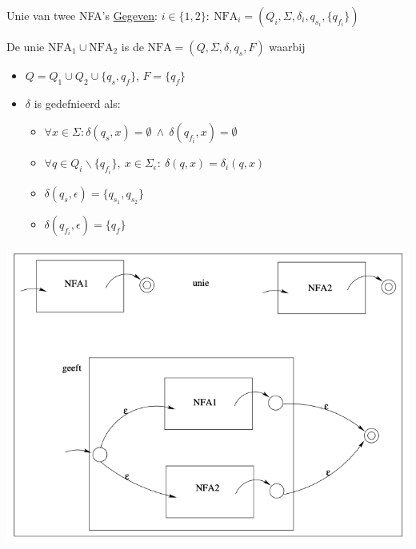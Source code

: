 \begin{pro}{Unie van twee NFA's}
    \underline{Gegeven}: $i \in \{1,2\}: \ \text{NFA}_i = (Q_i,\Sigma, \delta_i, q_{s_i}, \{q_{f_i}\})$ \\
    

    \begin{minipage}{.6\textwidth}
        De unie $\text{NFA}_1 \cup \text{NFA}_2$ is de $\text{NFA} = (Q,\Sigma, \delta, q_s, F)$ waarbij 
        \begin{itemize}
            \item $Q = Q_1 \cup Q_2 \cup \{ q_s, q_f \}$, $F = \{q_f\}$
            \item $\delta$  is gedefnieerd als:
            \begin{itemize}
                \item $\forall x \in \Sigma: \delta(q_s, x) = \emptyset \ \land \ \delta(q_{f_{i}}, x) = \emptyset$
                \item $\forall q \in Q_{i} \backslash \{q_{f_{i}}\}, \ x \in \Sigma_{\epsilon}: \ \delta(q,x) = \delta_i(q,x)$
                \item $\delta(q_s, \epsilon) = \{q_{s_{1}}, q_{s_{2}}\}$
                \item $\delta(q_{f_{i}}, \epsilon) = \{q_f\}$
            \end{itemize}
        \end{itemize}
    \end{minipage}
    \begin{minipage}{.36\textwidth}
        \includegraphics[scale = 0.225]{Images/UnieNFA}
    \end{minipage}
\end{pro}


